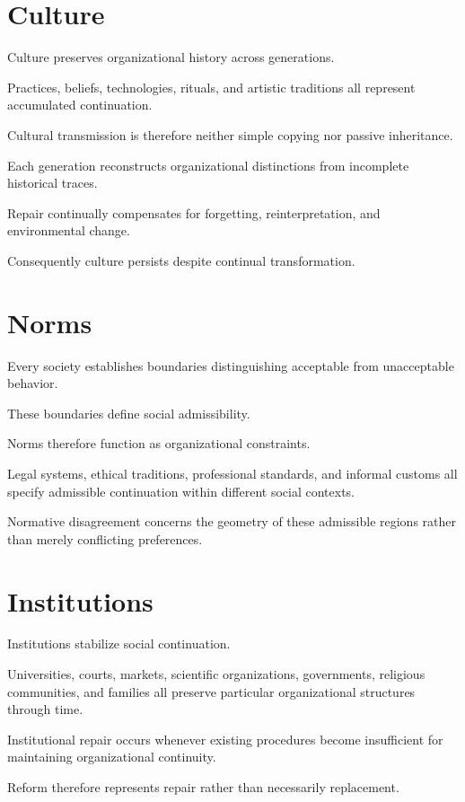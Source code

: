 \documentclass[11pt,oneside]{book}
\numberwithin{equation}{chapter}
\theoremstyle{definition}
\theoremstyle{plain}
\begin{document}
\section{Culture}

Culture preserves organizational history across generations.

Practices, beliefs, technologies, rituals, and artistic traditions all
represent accumulated continuation.

Cultural transmission is therefore neither simple copying nor passive
inheritance.

Each generation reconstructs organizational distinctions from incomplete
historical traces.

Repair continually compensates for forgetting, reinterpretation, and
environmental change.

Consequently culture persists despite continual transformation.

\section{Norms}

Every society establishes boundaries distinguishing acceptable from
unacceptable behavior.

These boundaries define social admissibility.

Norms therefore function as organizational constraints.

Legal systems, ethical traditions, professional standards, and informal
customs all specify admissible continuation within different social
contexts.

Normative disagreement concerns the geometry of these admissible regions
rather than merely conflicting preferences.

\section{Institutions}

Institutions stabilize social continuation.

Universities, courts, markets, scientific organizations, governments,
religious communities, and families all preserve particular organizational
structures through time.

Institutional repair occurs whenever existing procedures become
insufficient for maintaining organizational continuity.

Reform therefore represents repair rather than necessarily replacement.
\end{document}
